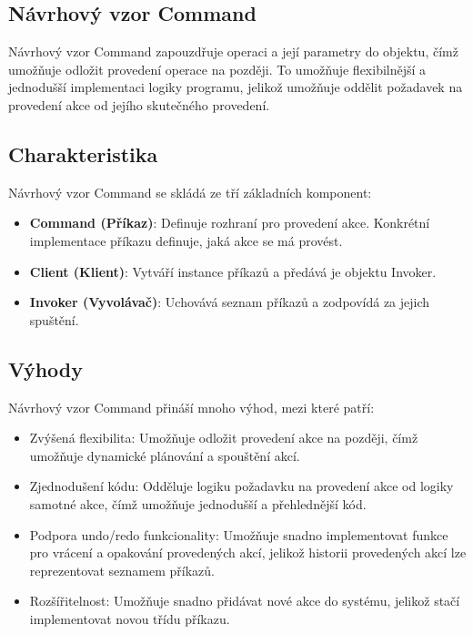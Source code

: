 \documentclass{article}
\begin{document}
    \begin{Návrhový vzor - Command}
        \section{Návrhový vzor Command}
        Návrhový vzor Command zapouzdřuje operaci a její parametry do objektu, čímž umožňuje odložit provedení operace na později.
        To umožňuje flexibilnější a jednodušší implementaci logiky programu, jelikož umožňuje oddělit požadavek na provedení akce od jejího skutečného provedení.

        \subsection{Charakteristika}

        Návrhový vzor Command se skládá ze tří základních komponent:

        \begin{itemize}
            \item \textbf{Command (Příkaz)}: Definuje rozhraní pro provedení akce.
            Konkrétní implementace příkazu definuje, jaká akce se má provést.
            \item \textbf{Client (Klient)}: Vytváří instance příkazů a předává je objektu Invoker.
            \item \textbf{Invoker (Vyvolávač)}: Uchovává seznam příkazů a zodpovídá za jejich spuštění.
        \end{itemize}

        \subsection{Výhody}

        Návrhový vzor Command přináší mnoho výhod, mezi které patří:

        \begin{itemize}
            \item Zvýšená flexibilita: Umožňuje odložit provedení akce na později, čímž umožňuje dynamické plánování a spouštění akcí.
            \item Zjednodušení kódu: Odděluje logiku požadavku na provedení akce od logiky samotné akce, čímž umožňuje jednodušší a přehlednější kód.
            \item Podpora undo/redo funkcionality: Umožňuje snadno implementovat funkce pro vrácení a opakování provedených akcí, jelikož historii provedených akcí lze reprezentovat seznamem příkazů.
            \item Rozšířitelnost: Umožňuje snadno přidávat nové akce do systému, jelikož stačí implementovat novou třídu příkazu.
        \end{itemize}


\end{Návrhový vzor - Command}
\end{document}
